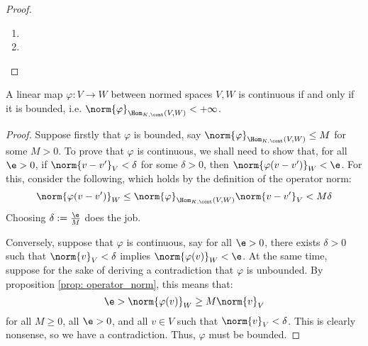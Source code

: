             \begin{proof}
                \begin{enumerate}
                    \item 
                    \item 
                \end{enumerate}
            \end{proof}
        \begin{lemma} \label{lemma: bounded_linear_maps}
            A linear map $\varphi: V \to W$ between normed spaces $V, W$ is continuous if and only if it is bounded, i.e. $\norm{\varphi}_{\Hom_{K, \cont}(V, W)} < +\infty$.
        \end{lemma}
            \begin{proof}
                Suppose firstly that $\varphi$ is bounded, say $\norm{\varphi}_{\Hom_{K, \cont}(V, W)} \leq M$ for some $M > 0$. To prove that $\varphi$ is continuous, we shall need to show that, for all $\e > 0$, if $\norm{v - v'}_V < \delta$ for some $\delta > 0$, then $\norm{\varphi(v - v')}_W < \e$. For this, consider the following, which holds by the definition of the operator norm:
                    $$\norm{\varphi(v - v')}_W \leq \norm{\varphi}_{\Hom_{K, \cont}(V, W)} \norm{v - v'}_V < M \delta$$
                Choosing $\delta := \frac{\e}{M}$ does the job.

                Conversely, suppose that $\varphi$ is continuous, say for all $\e > 0$, there exists $\delta > 0$ such that $\norm{v}_V < \delta$ implies $\norm{\varphi(v)}_W < \e$. At the same time, suppose for the sake of deriving a contradiction that $\varphi$ is unbounded. By proposition \ref{prop: operator_norm}, this means that:
                    $$\e > \norm{\varphi(v)}_W \geq M \norm{v}_V$$
                for all $M \geq 0$, all $\e > 0$, and all $v \in V$ such that $\norm{v}_V < \delta$. This is clearly nonsense, so we have a contradiction. Thus, $\varphi$ must be bounded.
            \end{proof}

